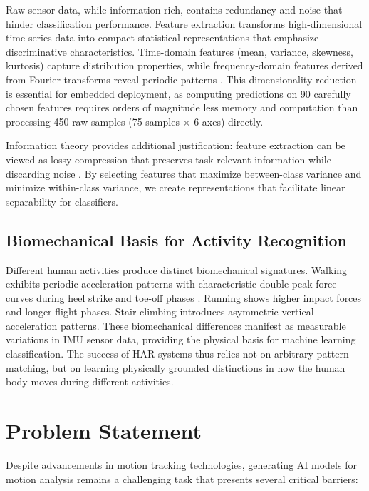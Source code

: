 Raw sensor data, while information-rich, contains redundancy and noise that hinder classification performance. Feature extraction transforms high-dimensional time-series data into compact statistical representations that emphasize discriminative characteristics. Time-domain features (mean, variance, skewness, kurtosis) capture distribution properties, while frequency-domain features derived from Fourier transforms reveal periodic patterns \cite{oppenheim1999discrete}. This dimensionality reduction is essential for embedded deployment, as computing predictions on 90 carefully chosen features requires orders of magnitude less memory and computation than processing 450 raw samples (75 samples × 6 axes) directly.

Information theory provides additional justification: feature extraction can be viewed as lossy compression that preserves task-relevant information while discarding noise \cite{cover2006elements}. By selecting features that maximize between-class variance and minimize within-class variance, we create representations that facilitate linear separability for classifiers.

\subsection{Biomechanical Basis for Activity Recognition}

Different human activities produce distinct biomechanical signatures. Walking exhibits periodic acceleration patterns with characteristic double-peak force curves during heel strike and toe-off phases \cite{whittle2014gait}. Running shows higher impact forces and longer flight phases. Stair climbing introduces asymmetric vertical acceleration patterns. These biomechanical differences manifest as measurable variations in IMU sensor data, providing the physical basis for machine learning classification. The success of HAR systems thus relies not on arbitrary pattern matching, but on learning physically grounded distinctions in how the human body moves during different activities.

\section{Problem Statement}

Despite advancements in motion tracking technologies, generating AI models for motion analysis remains a challenging task that presents several critical barriers:

